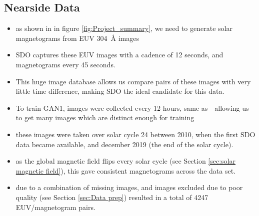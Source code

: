 \documentclass[11pt,a4paper,onecolumn]{report}
\begin{document}
\subsection{Nearside Data}
\begin{itemize}
  \item as shown in in figure \ref{fig:Project_summary}, we need to generate solar
        magnetograms from EUV \SI[]{304}[]{\angstrom} images
  \item SDO captures these EUV images with a cadence of 12 seconds, and
        magnetograms every 45 seconds.
  \item This huge image database allows us compare pairs of these images with
        very little time difference, making SDO the ideal candidate for this data.
  \item To train GAN1, images were collected every 12 hours, same as
        \cite{Kim2019} - allowing us to get many images which are distinct enough for
        training
  \item these images were taken over solar cycle 24 between 2010, when the first
        SDO data became available, and december 2019 (the end of the solar cycle).
  \item as the global magnetic field flips every solar cycle (see Section
        \ref{sec:solar magnetic field}), this gave consistent magnetograms across the
        data set.
  \item due to a combination of missing images, and images excluded due to poor
        quality (see Section \ref{sec:Data prep}) resulted in a total of 4247
        EUV/magnetogram pairs.

\end{itemize}
\end{document}
